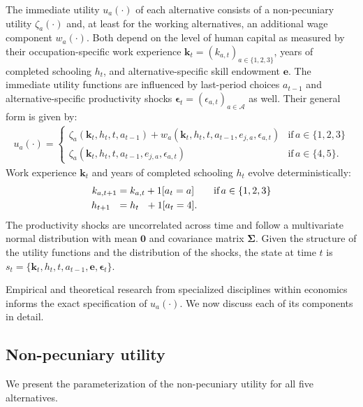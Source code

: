 The immediate utility $u_a(\cdot)$ of each alternative consists of a non-pecuniary utility $\zeta_a(\cdot)$ and, at least for the working alternatives, an additional wage component $w_a(\cdot)$. Both depend on the level of human capital as measured by their occupation-specific work experience $\bm{k}_t = \left(k_{a,t}\right)_{a\in\{1, 2, 3\}}$, years of completed schooling $h_t$, and alternative-specific skill endowment $\bm{e}$. The immediate utility functions are influenced by last-period choices $a_{t -1}$ and alternative-specific productivity shocks $\bm{\epsilon}_t = \left(\epsilon_{a,t}\right)_{a\in\mathcal{A}}$ as well. Their general form is given by:
%
\begin{align*}
u_a(\cdot) =
\begin{cases}
    \zeta_a(\bm{k}_t, h_t, t, a_{t -1})  + w_a(\bm{k}_t, h_t, t, a_{t -1}, e_{j, a}, \epsilon_{a,t})                & \text{if}\, a \in \{1, 2, 3\}  \\
    \zeta_a(\bm{k}_t, h_t, t, a_{t-1}, e_{j,a}, \epsilon_{a,t})                                                  &  \text{if}\, a \in \{4, 5\}.
\end{cases}
\end{align*}
%
Work experience $\bm{k}_t$  and years of completed schooling $h_t$ evolve deterministically:
%
\begin{align*}
	k_{a,t+1} & = k_{a,t} + 1[a_t = a]  \qquad \text{if}\, a \in \{1, 2, 3\} \\
	h_{t + 1\phantom{,a}} & = h_{t\phantom{,a}} +   1[a_t = 4].
\end{align*}
%
\noindent The productivity shocks are uncorrelated across time and follow a multivariate normal distribution with mean $\bm{0}$ and covariance matrix $\bm{\Sigma}$. Given the structure of the utility functions and the distribution of the shocks, the state at time $t$ is $s_t = \{\bm{k}_t, h_t, t, a_{t -1}, \bm{e},\bm{\epsilon}_t\}$.

Empirical and theoretical research from specialized disciplines within economics informs the exact specification of $u_a(\cdot)$. We now discuss each of its components in detail.
\subsection{Non-pecuniary utility}
We present the parameterization of the non-pecuniary utility for all five alternatives.
